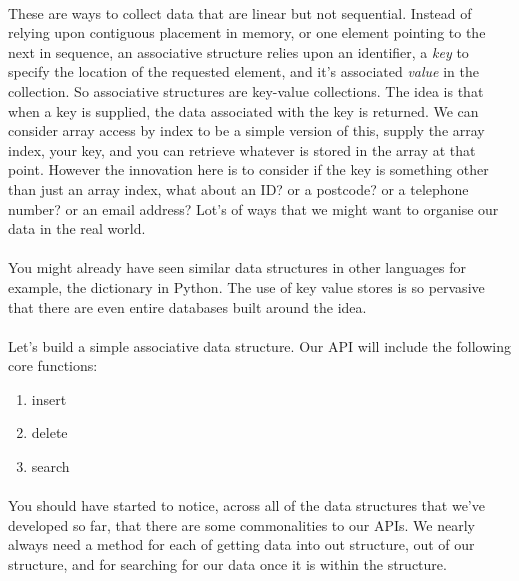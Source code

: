 \documentclass[10pt, a4paper, twosize]{article}
\begin{document}
\paragraph{} These are ways to collect data that are linear but not sequential. Instead of relying upon contiguous placement in memory, or one element pointing to the next in sequence, an associative structure relies upon an identifier, a \emph{key} to specify the location of the requested element, and it's associated \emph{value} in the collection. So associative structures are key-value collections. The idea is that when a key is supplied, the data associated with the key is returned. We can consider array access by index to be a simple version of this, supply the array index, your key, and you can retrieve whatever is stored in the array at that point. However the innovation here is to consider if the key is something other than just an array index, what about an ID? or a postcode? or a telephone number? or an email address? Lot's of ways that we might want to organise our data in the real world.

\paragraph{} You might already have seen similar data structures in other languages for example, the dictionary in Python. The use of key value stores is so pervasive that there are even entire databases built around the idea.

\paragraph{} Let's build a simple associative data structure. Our API will include the following core functions:
\begin{enumerate}
\item insert
\item delete
\item search
\end{enumerate}
\paragraph{} You should have started to notice, across all of the data structures that we've developed so far, that there are some commonalities to our APIs. We nearly always need a method for each of getting data into out structure, out of our structure, and for searching for our data once it is within the structure.
\end{document}
